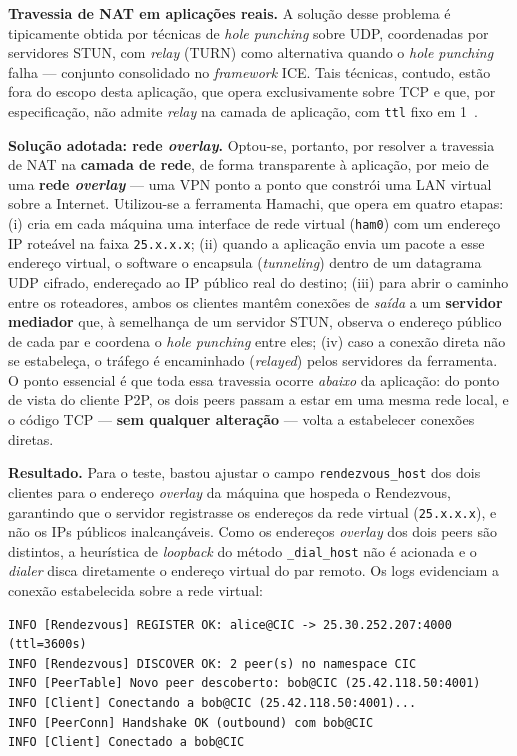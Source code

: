 \documentclass[12pt, a4paper]{article}
\begin{document}
\textbf{Travessia de NAT em aplicações reais.} A solução desse problema é tipicamente obtida por técnicas de \textit{hole punching} sobre UDP, coordenadas por servidores STUN, com \textit{relay} (TURN) como alternativa quando o \textit{hole punching} falha --- conjunto consolidado no \textit{framework} ICE. Tais técnicas, contudo, estão fora do escopo desta aplicação, que opera exclusivamente sobre TCP e que, por especificação, não admite \textit{relay} na camada de aplicação, com \texttt{ttl} fixo em 1~\cite{pyp2p}.

\textbf{Solução adotada: rede \textit{overlay}.} Optou-se, portanto, por resolver a travessia de NAT na \textbf{camada de rede}, de forma transparente à aplicação, por meio de uma \textbf{rede \textit{overlay}} --- uma VPN ponto a ponto que constrói uma LAN virtual sobre a Internet. Utilizou-se a ferramenta Hamachi, que opera em quatro etapas: (i) cria em cada máquina uma interface de rede virtual (\texttt{ham0}) com um endereço IP roteável na faixa \texttt{25.x.x.x}; (ii) quando a aplicação envia um pacote a esse endereço virtual, o software o encapsula (\textit{tunneling}) dentro de um datagrama UDP cifrado, endereçado ao IP público real do destino; (iii) para abrir o caminho entre os roteadores, ambos os clientes mantêm conexões de \textit{saída} a um \textbf{servidor mediador} que, à semelhança de um servidor STUN, observa o endereço público de cada par e coordena o \textit{hole punching} entre eles; (iv) caso a conexão direta não se estabeleça, o tráfego é encaminhado (\textit{relayed}) pelos servidores da ferramenta. O ponto essencial é que toda essa travessia ocorre \textit{abaixo} da aplicação: do ponto de vista do cliente P2P, os dois peers passam a estar em uma mesma rede local, e o código TCP --- \textbf{sem qualquer alteração} --- volta a estabelecer conexões diretas.

\textbf{Resultado.} Para o teste, bastou ajustar o campo \texttt{rendezvous\_host} dos dois clientes para o endereço \textit{overlay} da máquina que hospeda o Rendezvous, garantindo que o servidor registrasse os endereços da rede virtual (\texttt{25.x.x.x}), e não os IPs públicos inalcançáveis. Como os endereços \textit{overlay} dos dois peers são distintos, a heurística de \textit{loopback} do método \texttt{\_dial\_host} não é acionada e o \textit{dialer} disca diretamente o endereço virtual do par remoto. Os logs evidenciam a conexão estabelecida sobre a rede virtual:

\begin{lstlisting}[style=terminal]
INFO [Rendezvous] REGISTER OK: alice@CIC -> 25.30.252.207:4000 (ttl=3600s)
INFO [Rendezvous] DISCOVER OK: 2 peer(s) no namespace CIC
INFO [PeerTable] Novo peer descoberto: bob@CIC (25.42.118.50:4001)
INFO [Client] Conectando a bob@CIC (25.42.118.50:4001)...
INFO [PeerConn] Handshake OK (outbound) com bob@CIC
INFO [Client] Conectado a bob@CIC
\end{lstlisting}
\end{document}
